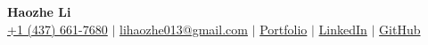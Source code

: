 
\begin{center}
  \textbf{\Huge Haozhe Li} \\ \vspace{4pt}
  \small
  \href{tel:+14376617680}{\faPhone\enspace +1 (437) 661-7680} $|$
  \href{mailto:lihaozhe013@gmail.com}{\faEnvelope\enspace lihaozhe013@gmail.com} $|$
  \href{https://lihaozhe013.github.io/}{\faBriefcase\enspace Portfolio} $|$
  \href{https://linkedin.com/in/lihaozhe013}{\faLinkedinSquare\enspace LinkedIn} $|$
  \href{https://github.com/lihaozhe013}{\faGithub\enspace GitHub}
\end{center}
